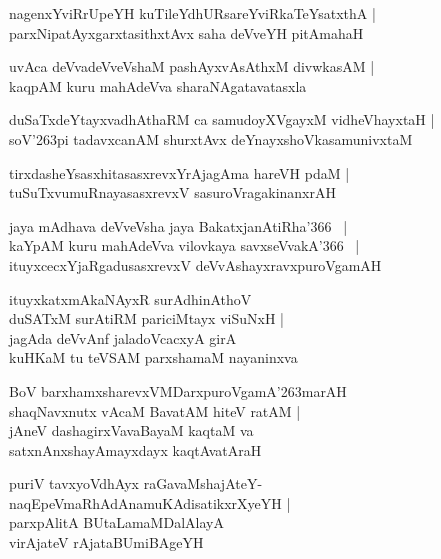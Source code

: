 \documentclass[twoside,12pt,openright]{book}
\def\S{\char'263}
\newcounter{shloka}[chapter]
\begin{document}
\begin{shloka}%
nagenxYviRrUpeYH kuTileYdhURsareYviRkaTeYsatxthA |\\
parxNipatAyxgarxtasithxtAvx saha deVveYH pitAmahaH
\end{shloka}

\begin{shloka}%
uvAca deVvadeVveVshaM pashAyxvAsAthxM divwkasAM |\\
kaqpAM kuru mahAdeVva sharaNAgatavatasxla
\end{shloka}

\begin{shloka}%
duSaTxdeYtayxvadhAthaRM ca samudoyXVgayxM vidheVhayxtaH |\\
soV\S pi tadavxcanAM shurxtAvx deYnayxshoVkasamunivxtaM 
\end{shloka}

\begin{shloka}%
tirxdasheYsasxhitasasxrevxYrAjagAma hareVH pdaM |\\
tuSuTxvumuRnayasasxrevxV sasuroVragakinanxrAH
\end{shloka}

\begin{shloka}%
jaya mAdhava deVveVsha jaya BakatxjanAtiRha\char'366 ~|\\
kaYpAM kuru mahAdeVva vilovkaya savxseVvakA\char'366 ~|\\
ituyxcecxYjaRgadusasxrevxV deVvAshayxravxpuroVgamAH
\end{shloka}

\begin{shloka}%
ituyxkatxmAkaNAyxR surAdhinAthoV \\
duSATxM surAtiRM pariciMtayx viSuNxH |\\
jagAda deVvAnf jaladoVcacxyA girA \\
kuHKaM tu teVSAM parxshamaM nayaninxva 
\end{shloka}

\begin{shloka}%
BoV barxhamxsharevxVMDarxpuroVgamA\S marAH\\
shaqNavxnutx vAcaM BavatAM hiteV ratAM |\\
jAneV dashagirxVavaBayaM kaqtaM va \\
satxnAnxshayAmayxdayx kaqtAvatAraH
\end{shloka}

\begin{shloka}%
puriV tavxyoVdhAyx raGavaMshajAteY-\\
naqEpeVmaRhAdAnamuKAdisatikxrXyeYH |\\
parxpAlitA BUtaLamaMDalAlayA \\
virAjateV rAjataBUmiBAgeYH
\end{shloka}
\end{document}
